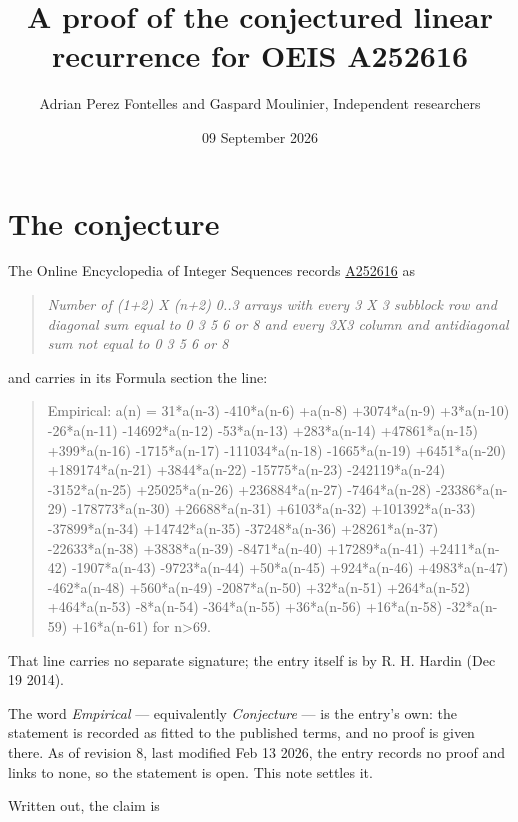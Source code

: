 \documentclass[11pt]{article}
\title{A proof of the conjectured linear recurrence for OEIS A252616}
\author{Adrian Perez Fontelles and Gaspard Moulinier, Independent researchers}
\date{09 September 2026}
\theoremstyle{definition}
\begin{document}
\maketitle
\section{The conjecture}

The Online Encyclopedia of Integer Sequences records \href{https://oeis.org/A252616}{A252616} as

\begin{quote}\itshape Number of (1+2) X (n+2) 0..3 arrays with every 3 X 3 subblock row and diagonal sum equal to 0 3 5 6 or 8 and every 3X3 column and antidiagonal sum not equal to 0 3 5 6 or 8\end{quote}

and carries in its Formula section the line:

\begin{quote}\ttfamily Empirical: a(n) = 31*a(n-3) -410*a(n-6) +a(n-8) +3074*a(n-9) +3*a(n-10) -26*a(n-11) -14692*a(n-12) -53*a(n-13) +283*a(n-14) +47861*a(n-15) +399*a(n-16) -1715*a(n-17) -111034*a(n-18) -1665*a(n-19) +6451*a(n-20) +189174*a(n-21) +3844*a(n-22) -15775*a(n-23) -242119*a(n-24) -3152*a(n-25) +25025*a(n-26) +236884*a(n-27) -7464*a(n-28) -23386*a(n-29) -178773*a(n-30) +26688*a(n-31) +6103*a(n-32) +101392*a(n-33) -37899*a(n-34) +14742*a(n-35) -37248*a(n-36) +28261*a(n-37) -22633*a(n-38) +3838*a(n-39) -8471*a(n-40) +17289*a(n-41) +2411*a(n-42) -1907*a(n-43) -9723*a(n-44) +50*a(n-45) +924*a(n-46) +4983*a(n-47) -462*a(n-48) +560*a(n-49) -2087*a(n-50) +32*a(n-51) +264*a(n-52) +464*a(n-53) -8*a(n-54) -364*a(n-55) +36*a(n-56) +16*a(n-58) -32*a(n-59) +16*a(n-61) for n>69.\end{quote}

That line carries no separate signature; the entry itself is by R. H. Hardin (Dec 19 2014).

The word {\itshape Empirical} --- equivalently {\itshape Conjecture} --- is the entry's own: the statement is recorded as fitted to the published terms, and no proof is given there. As of revision 8, last modified Feb 13 2026, the entry records no proof and links to none, so the statement is open. This note settles it.

Written out, the claim is
\end{document}
